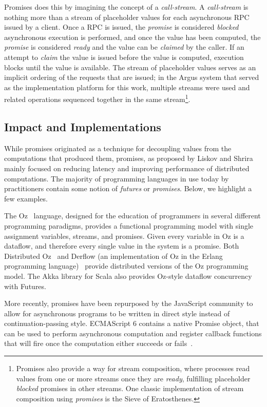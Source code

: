 Promises does this by imagining the concept of a \textit{call-stream}.  A \textit{call-stream} is nothing more than a stream of placeholder values for each asynchronous RPC issued by a client.  Once a RPC is issued, the \textit{promise} is considered \textit{blocked} asynchronous execution is performed, and once the value has been computed, the \textit{promise} is considered \textit{ready} and the value can be \textit{claimed} by the caller.  If an attempt to \textit{claim} the value is issued before the value is computed, execution blocks until the value is available.  The stream of placeholder values serves as an implicit ordering of the requests that are issued; in the Argus system that served as the implementation platform for this work, multiple streams were used and related operations sequenced together in the same stream\footnote{Promises also provide a way for stream composition, where processes read values from one or more streams once they are \textit{ready}, fulfilling placeholder \textit{blocked} promises in other streams.  One classic implementation of stream composition using \textit{promises} is the Sieve of Eratosthenes.}.

\subsection{Impact and Implementations}

While promises originated as a technique for decoupling values from the computations that produced them, promises, as proposed by Liskov and Shrira mainly focused on reducing latency and improving performance of distributed computations.  The majority of programming languages in use today by practitioners contain some notion of \textit{futures} or \textit{promises}.  Below, we highlight a few examples.

The Oz~\cite{henz1993oz} language, designed for the education of programmers in several different programming paradigms, provides a functional programming model with single assignment variables, streams, and promises.  Given every variable in Oz is a dataflow, and therefore every single value in the system is a promise.  Both Distributed Oz~\cite{haridi1997overview} and Derflow (an implementation of Oz in the Erlang programming language)~\cite{Bravo:2014:DDD:2633448.2633451} provide distributed versions of the Oz programming model.  The Akka library for Scala also provides Oz-style dataflow concurrency with Futures.

More recently, promises have been repurposed by the JavaScript community to allow for asynchronous programs to be written in direct style instead of continuation-passing style.  ECMAScript 6 contains a native Promise object, that can be used to perform asynchronous computation and register callback functions that will fire once the computation either succeeds or fails~\cite{wiki:futures}. 

